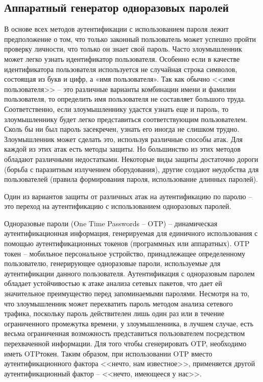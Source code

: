 \subsection{Аппаратный генератор одноразовых паролей}

В основе всех методов аутентификации с использованием пароля лежит предположение
о том, что только законный пользователь может успешно пройти проверку личности,
что только он знает свой пароль. Часто злоумышленник может легко узнать
идентификатор пользователя. Особенно если в качестве идентификатора пользователя
используется не случайная строка символов, состоящая из букв и цифр, а «имя
пользователя». Так как обычно <<имя пользователя>> -- это различные варианты
комбинации имени и фамилии пользователя, то определить имя пользователя не
составляет большого труда. Соответственно, если злоумышленнику удастся узнать
еще и пароль, то злоумышленнику будет легко представиться соответствующим
пользователем. Сколь бы ни был пароль засекречен, узнать его иногда не слишком
трудно. Злоумышленник может сделать это, используя различные способы атак. Для
каждой из этих атак есть методы защиты. Но большинство из этих методов обладают
различными недостатками. Некоторые виды защиты достаточно дороги (борьба с
паразитным излучением оборудования), другие создают неудобства для пользователей
(правила формирования пароля, использование длинных паролей).

Один из вариантов защиты от различных атак на аутентификацию по паролю -- это
переход на аутентификацию с использованием одноразовых паролей.

Одноразовые пароли (One Time Passwords -- OTP) -- динамическая
аутентификационная информация, генерируемая для единичного использования с помощью
аутентификационных токенов (программных или аппаратных).
OTP токен -- мобильное персональное устройство, принадлежащее определенному
пользователю, генерирующее одноразовые пароли, используемые для аутентификации
данного пользователя. Аутентификация с одноразовым паролем обладает
устойчивостью к атаке анализа сетевых пакетов, что дает ей значительное
преимущество перед запоминаемыми паролями. Несмотря на то, что злоумышленник
может перехватить пароль методом анализа сетевого трафика, поскольку пароль
действителен лишь один раз или в течение ограниченного промежутка времени, у
злоумышленника, в лучшем случае, есть весьма ограниченная возможность
представиться пользователем посредством перехваченной информации. Для того чтобы
сгенерировать OTP, необходимо иметь OTPтокен. Таким образом, при использовании
OTP вместо аутентификационного фактора <<нечто, нам известное>>, применяется
другой аутентификационный фактор -- <<нечто, имеющееся у нас>>.

